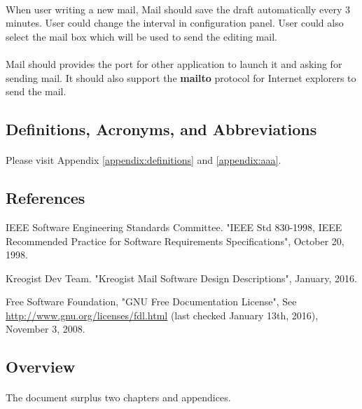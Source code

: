 \documentclass[11pt,a4paper]{article}
\begin{document}
            \paragraph{} When user writing a new mail, Mail should save the draft automatically every 3 minutes. User could change the interval in configuration panel. User could also select the mail box which will be used to send the editing mail.
            \paragraph{} Mail should provides the port for other application to launch it and asking for sending mail. It should also support the \textbf{mailto} protocol for Internet explorers to send the mail.
        \subsection{Definitions, Acronyms, and Abbreviations}
    		\paragraph{} Please visit Appendix \ref{appendix:definitions} and \ref{appendix:aaa}.
        \subsection{References}
            \begin{enumerate}[\texttt{[}1\texttt{]}.]
                \item IEEE Software Engineering Standards Committee. "IEEE Std 830-1998, IEEE Recommended Practice for Software Requirements Specifications", October 20, 1998.\label{ref:ieee}
                \item Kreogist Dev Team. "Kreogist Mail Software Design Descriptions", January, 2016.\label{ref:sdd}
                \item Free Software Foundation, "GNU Free Documentation License", See \url{http://www.gnu.org/licenses/fdl.html} (last checked January 13th, 2016), November 3, 2008.\label{ref:fdlv3}
            \end{enumerate}
        \subsection{Overview}
            \paragraph{} The document surplus two chapters and appendices.
\end{document}

